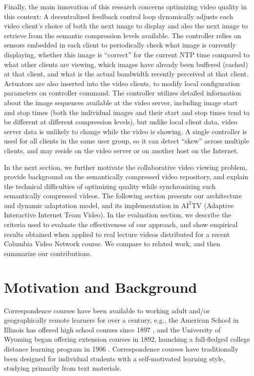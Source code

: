 \documentclass{sig-alternate}
\begin{document}
Finally, the main innovation of this research concerns optimizing
video quality in this context: A decentralized feedback control loop
dynamically adjusts each video client's choice of both the next image
to display and also the next image to retrieve from the semantic
compression levels available.  The controller relies on sensors
embedded in each client to periodically check what image is currently
displaying, whether this image is ``correct'' for the current NTP time
compared to what other clients are viewing, which images have already
been buffered (cached) at that client, and what is the actual
bandwidth recently perceived at that client.  Actuators are also
inserted into the video clients, to modify local configuration
parameters on controller command. The controller utilizes detailed
information about the image sequences available at the video server,
including image start and stop times (both the individual images and
their start and stop times tend to be different at different
compression levels), but unlike local client data, video server data
is unlikely to change while the video is showing.  A single controller
is used for all clients in the same user group, so it can detect
``skew'' across multiple clients, and may reside on the video server
or on another host on the Internet.

In the next section, we further motivate the collaborative video
viewing problem, provide background on the semantically compressed
video repository, and explain the technical difficulties of optimizing
quality while synchronizing such semantically compressed videos. The
following section presents our architecture and dynamic adaptation
model, and its implementation in $\mathrm{AI}^2$TV (Adaptive
Interactive Internet Team Video).  In the evaluation section, we
describe the criteria used to evaluate the effectiveness of our
approach, and show empirical results obtained when applied to real
lecture videos distributed for a recent Columbia Video Network
course. We compare to related work, and then summarize our
contributions.

\section{Motivation and Background} \label{background}


Correspondence courses have been available to working adult and/or
geographically remote learners for over a century, e.g., the American
School in Illinois has offered high school courses since 1897
\cite{AmericanSchool}, and the University of Wyoming began offering
extension courses in 1892, launching a full-fledged college distance
learning program in 1906 \cite{UWyoming}.  Correspondence courses have
traditionally been designed for individual students with a
self-motivated learning style, studying primarily from text materials.
\end{document}
